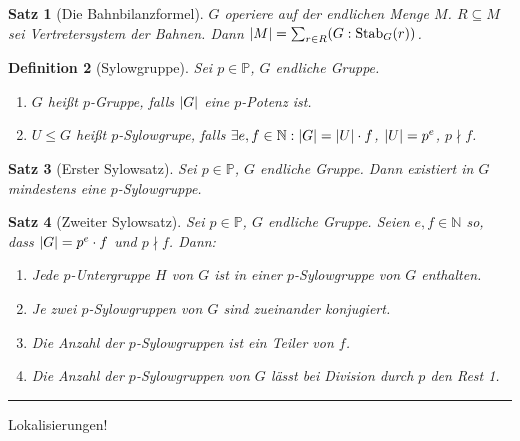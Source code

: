 \documentclass[a4paper]{article}
\newcounter{Sec}
\theoremstyle{marginbreak}
\newtheorem{definition}{Definition}[Sec]
\newtheorem{satz}[definition]{Satz}
\newcommand{\sep}{%
	\rule{\textwidth}{0.3pt}%
	\stepcounter{Sec}%
	}
\newcommand\ndivides\nmid
\newcommand{\N}{\mathbb{N}}
\renewcommand{\P}{\mathbb{P}}
\DeclareMathOperator{\Stab}{Stab}
\begin{document}
\begin{satz}[Die Bahnbilanzformel]
	$G$ operiere auf der endlichen Menge $M$. $R\subseteq M$ sei Vertretersystem der
	Bahnen. Dann $\abs{M}=\sum_{r\in R}(G:\Stab_G(r))$.
\end{satz}
\begin{definition}[Sylowgruppe]
	Sei $p\in\P$, $G$ endliche Gruppe.
	\begin{enumerate}[label=(\alph*)]
		\item $G$ heißt $p$-Gruppe, falls $\abs{G}$ eine $p$-Potenz ist.
		\item $U\leq G$ heißt $p$-Sylowgrupe, falls $\exists e, f\in\N: \abs{G}=\abs{U}\cdot f$,
			$\abs{U}=p^e$, $p\ndivides f$.
	\end{enumerate}
\end{definition}
\begin{satz}[Erster Sylowsatz]
	Sei $p\in\P$, $G$ endliche Gruppe. Dann existiert in $G$ mindestens eine $p$-Sylowgruppe.
\end{satz}
\begin{satz}[Zweiter Sylowsatz]
	Sei $p\in\P$, $G$ endliche Gruppe. Seien $e, f\in\N$ so, dass $\abs{G}=p^e\cdot f$
	und $p\ndivides f$. Dann:
	\begin{enumerate}[label=(\alph*)]
		\item Jede $p$-Untergruppe $H$ von $G$ ist in einer $p$-Sylowgruppe von $G$ enthalten.
		\item Je zwei $p$-Sylowgruppen von $G$ sind zueinander konjugiert.
		\item Die Anzahl der $p$-Sylowgruppen ist ein Teiler von $f$.
		\item Die Anzahl der $p$-Sylowgruppen von $G$ lässt bei Division durch $p$ den
			Rest 1.
	\end{enumerate}
\end{satz}
\sep

Lokalisierungen!
\end{document}

